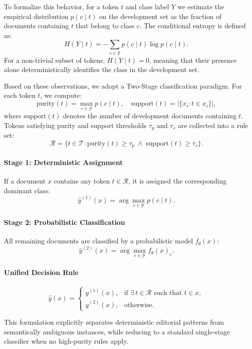 To formalize this behavior, for a token $t$ and class label $Y$ we estimate the
empirical distribution $p(c \mid t)$ on the development set as the fraction of
documents containing $t$ that belong to class $c$. The conditional entropy is
defined as:
\[
H(Y \mid t) = - \sum_{c \in \mathcal{Y}} p(c \mid t)\log p(c \mid t).
\]
For a non-trivial subset of tokens, $H(Y \mid t)=0$, meaning that their presence
alone deterministically identifies the class in the development set.

Based on these observations, we adopt a Two-Stage classification paradigm. For
each token $t$, we compute:
\[
\text{purity}(t) = \max_{c \in \mathcal{Y}} p(c \mid t), \quad
\text{support}(t) = |\{x_i : t \in x_i\}|,
\]
where $\text{support}(t)$ denotes the number of development documents
containing $t$. Tokens satisfying purity and support thresholds $\tau_p$ and
$\tau_s$ are collected into a rule set:
\[
\mathcal{R} = \{t \in \mathcal{T} : \text{purity}(t) \ge \tau_p \;\wedge\;
\text{support}(t) \ge \tau_s\}.
\]

\paragraph{Stage 1: Deterministic Assignment}
If a document $x$ contains any token $t \in \mathcal{R}$, it is assigned the
corresponding dominant class:
\[
\hat{y}^{(1)}(x) = \arg\max_{c \in \mathcal{Y}} p(c \mid t).
\]

\paragraph{Stage 2: Probabilistic Classification}
All remaining documents are classified by a probabilistic model $f_\theta(x)$:
\[
\hat{y}^{(2)}(x) = \arg\max_{c \in \mathcal{Y}} f_\theta(x)_c.
\]

\paragraph{Unified Decision Rule}
\[
\hat{y}(x) =
\begin{cases}
\hat{y}^{(1)}(x), & \text{if } \exists\, t \in \mathcal{R} \text{ such that } t \in x, \\
\hat{y}^{(2)}(x), & \text{otherwise}.
\end{cases}
\]

This formulation explicitly separates deterministic editorial patterns from
semantically ambiguous instances, while reducing to a standard single-stage
classifier when no high-purity rules apply.
